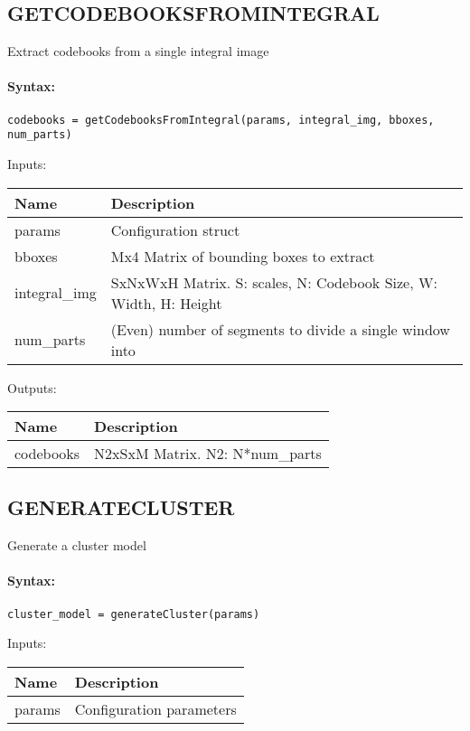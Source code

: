 \subsection{GETCODEBOOKSFROMINTEGRAL}

Extract codebooks from a single integral image

\paragraph{Syntax:} \verb|codebooks = getCodebooksFromIntegral(params, integral_img, bboxes, num_parts)|

\bigskip
Inputs:

\begin{tabular}{|p{}|p{}|}
\hline
\textbf{Name} & \textbf{Description} \\
\hline \hline
params & Configuration struct  \\ \hline
bboxes & Mx4 Matrix of bounding boxes to extract  \\ \hline
integral\_img & SxNxWxH Matrix. S: scales, N: Codebook Size, W: Width, H: Height  \\ \hline
num\_parts & (Even) number of segments to divide a single window into  \\ \hline
\end{tabular}

\bigskip
Outputs:

\begin{tabular}{|p{}|p{}|}
\hline
\textbf{Name} & \textbf{Description} \\
\hline \hline
codebooks & N2xSxM Matrix. N2: N*num\_parts  \\ \hline
\end{tabular}

\subsection{GENERATECLUSTER}

Generate a cluster model

\paragraph{Syntax:} \verb|cluster_model = generateCluster(params)|

\bigskip
Inputs:

\begin{tabular}{|p{}|p{}|}
\hline
\textbf{Name} & \textbf{Description} \\
\hline \hline
params & Configuration parameters  \\ \hline
\end{tabular}


